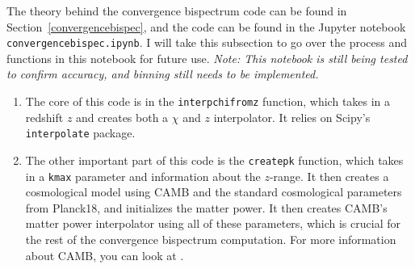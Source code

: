 \documentclass[11pt]{article}
\renewcommand{\_}[1]{\underline{ #1 }}
\newcommand{\us}{\textunderscore}
\begin{document}
{The theory behind the convergence bispectrum code can be found in Section~\ref{convergencebispec}, and the code can be found in the Jupyter notebook \texttt{convergence\textunderscore bispec.ipynb}. I will take this subsection to go over the process and functions in this notebook for future use. \textit{Note: This notebook is still being tested to confirm accuracy, and binning still needs to be implemented.}
\begin{enumerate}
    \item The core of this code is in the \texttt{interp\us chi\us from\us z} function, which takes in a redshift $z$ and creates both a $\chi$ and $z$ interpolator. It relies on Scipy's \texttt{interpolate} package.
    \item The other important part of this code is the \texttt{create\us pk} function, which takes in a \texttt{kmax} parameter and information about the $z$-range. It then creates a cosmological model using CAMB and the standard cosmological parameters from Planck18, and initializes the matter power. It then creates CAMB's matter power interpolator using all of these parameters, which is crucial for the rest of the convergence bispectrum computation. For more information about CAMB, you can look at \cite{CAMB}.
\end{enumerate}

}
\end{document}
